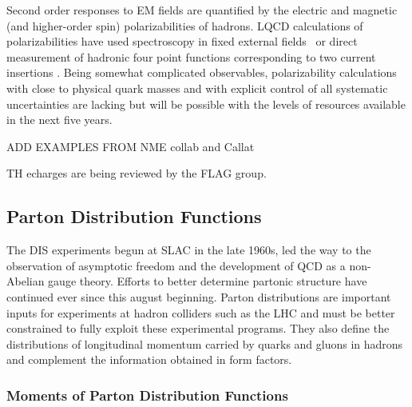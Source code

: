 Second order responses to EM fields are quantified by the electric and magnetic (and higher-order spin) polarizabilities of hadrons. LQCD calculations of polarizabilities have used spectroscopy in fixed external fields~\cite{Savage:2016kon,Shanahan:2017bgi,Tiburzi:2017iux} or direct measurement of hadronic four point functions corresponding to two current insertions \cite{Ref:TwoCur}. Being somewhat complicated observables, polarizability calculations with close to physical quark masses and with explicit control of all systematic uncertainties are lacking but will be possible with the levels of resources available in the next five years.


ADD EXAMPLES FROM NME collab and Callat

TH echarges are being reviewed by the FLAG group.

\subsection{Parton Distribution Functions}



The DIS experiments begun at SLAC in the late 1960s, led the way to the observation of asymptotic freedom and the development of QCD as a non-Abelian gauge theory. Efforts to better determine partonic structure have continued ever since this august beginning. Parton distributions are important inputs for experiments at hadron colliders such as the LHC and must be better constrained to fully exploit these experimental programs. They also define the distributions of longitudinal momentum carried by quarks and gluons in hadrons and complement the information obtained in form factors.


\subsubsection{Moments of Parton Distribution Functions}

